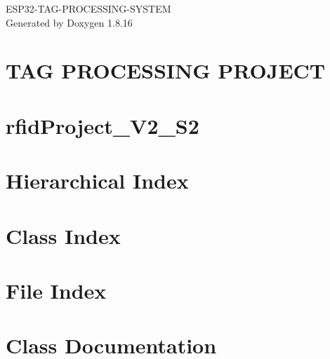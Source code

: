 \let\mypdfximage\pdfximage\def\pdfximage{\immediate\mypdfximage}\documentclass[twoside]{book}
\newcommand{\+}{\discretionary{\mbox{\scriptsize$\hookleftarrow$}}{}{}}
\newcommand{\clearemptydoublepage}{%
  \newpage{\pagestyle{empty}\cleardoublepage}%
}
\begin{document}
\hypersetup{pageanchor=false,
             bookmarksnumbered=true,
             pdfencoding=unicode
            }
\begin{titlepage}
\vspace*{7cm}
\begin{center}%
{\Large E\+S\+P32-\/\+T\+A\+G-\/\+P\+R\+O\+C\+E\+S\+S\+I\+N\+G-\/\+S\+Y\+S\+T\+EM }\\
\vspace*{1cm}
{\large Generated by Doxygen 1.8.16}\\
\end{center}
\end{titlepage}
\clearemptydoublepage
{}
\tableofcontents
\clearemptydoublepage
{}
\hypersetup{pageanchor=true}

\chapter{T\+AG P\+R\+O\+C\+E\+S\+S\+I\+NG P\+R\+O\+J\+E\+CT}
\label{index}\hypertarget{index}{}
\chapter{rfid\+Project\+\_\+\+V2\+\_\+\+S2}
\label{md__home_lance_eclipse-workspace_rfidProject_V2_S2_README}

\chapter{Hierarchical Index}

\chapter{Class Index}

\chapter{File Index}

\chapter{Class Documentation}




















\end{document}
